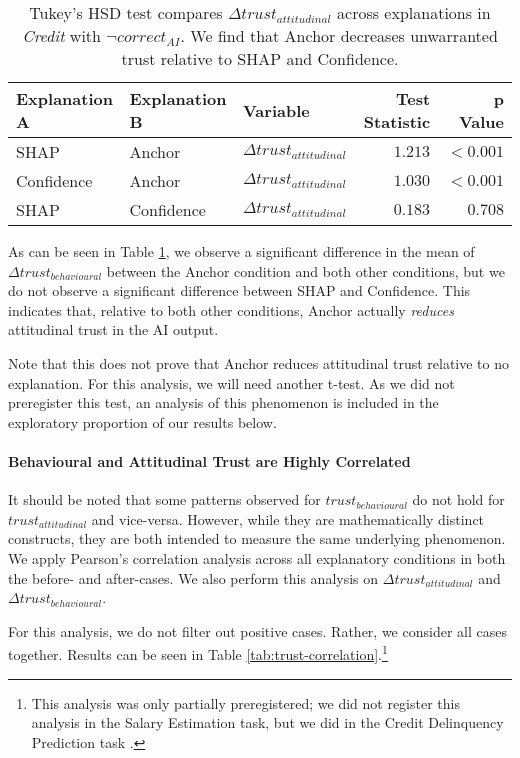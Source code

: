 \begin{table}[htb]
    \centering
    \caption{Tukey's HSD test compares $\Delta trust_{attitudinal}$ across explanations in \emph{Credit} with $\neg correct_{AI}$. We find that Anchor decreases unwarranted trust relative to SHAP and Confidence.}
    \label{tab:delta-trust-hsd-2}
    \begin{tabular}{lllrr}
        \toprule
        Explanation A & Explanation B & Variable & Test Statistic & p Value \\
        \midrule
        SHAP & Anchor & $\Delta trust_{attitudinal}$ & $\mathbf{1.213}$ & $\mathbf{<0.001}$ \\
        Confidence & Anchor & $\Delta trust_{attitudinal}$ & $\mathbf{1.030}$ & $\mathbf{<0.001}$ \\
        SHAP & Confidence & $\Delta trust_{attitudinal}$ & $0.183$ & $0.708$ \\
        \bottomrule
    \end{tabular}
\end{table}

As can be seen in Table \ref{tab:delta-trust-hsd-2}, we observe a significant difference in the mean of $\Delta trust_{behavioural}$ between the Anchor condition and both other conditions, but we do not observe a significant difference between SHAP and Confidence. This indicates that, relative to both other conditions, Anchor actually \emph{reduces} attitudinal trust in the AI output.

Note that this does not prove that Anchor reduces attitudinal trust relative to no explanation. For this analysis, we will need another t-test. As we did not preregister this test, an analysis of this phenomenon is included in the exploratory proportion of our results below.

\paragraph{Behavioural and Attitudinal Trust are Highly Correlated}
It should be noted that some patterns observed for $trust_{behavioural}$ do not hold for $trust_{attitudinal}$ and vice-versa. However, while they are mathematically distinct constructs, they are both intended to measure the same underlying phenomenon. We apply Pearson's correlation analysis across all explanatory conditions in both the before- and after-cases. We also perform this analysis on $\Delta trust_{attitudinal}$ and $\Delta trust_{behavioural}$. 

For this analysis, we do not filter out positive cases. Rather, we consider all cases together. Results can be seen in Table \ref{tab:trust-correlation}.\footnote{This analysis was only partially preregistered; we did not register this analysis in the Salary Estimation task, but we did in the Credit Delinquency Prediction task \cite{natarajan_binns_2022}.}

